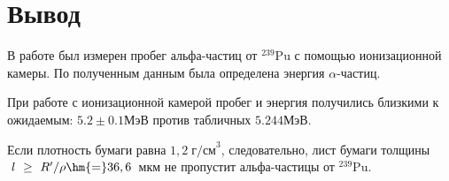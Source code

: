 \documentclass[a4paper, 12pt]{article}
\begin{document}
	\section*{Вывод}
	В работе был измерен пробег альфа-частиц от $ ^{239}  $Pu с помощью ионизационной камеры. По полученным данным была определена энергия $\alpha$-частиц.
	
	При работе с ионизационной камерой пробег и энергия получились близкими к ожидаемым: $5.2\pm0.1$МэВ против табличных $5.244$МэВ.  
	
	Если плотность бумаги равна $ 1,2 \; \text{г/см}^3 $, следовательно, лист бумаги толщины $~l~\geq~R'/\rho \hm{=}36, 6 $~мкм не пропустит альфа-частицы от $ ^{239}  $Pu.
\end{document}
